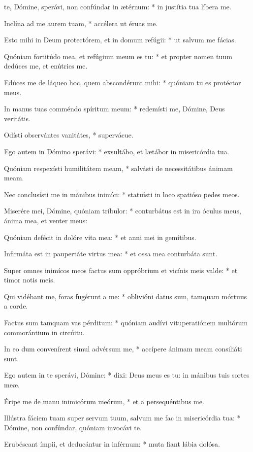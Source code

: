 \begin{psalmus}

 te, Dómine, sperávi, non confúndar in ætérnum: * in justítia tua líbera me.

Inclína ad me aurem tuam, * accélera ut éruas me.

Esto mihi in Deum protectórem, et in domum refúgii: * ut salvum me fácias.

Quóniam fortitúdo mea, et refúgium meum es tu: * et propter nomen tuum dedúces me, et enútries me.

Edúces me de láqueo hoc, quem abscondérunt mihi: * quóniam tu es protéctor meus.

In manus tuas comméndo spíritum meum: * redemísti me, Dómine, Deus veritátis.

Odísti observántes vanitátes, * supervácue.

Ego autem in Dómino sperávi: * exsultábo, et lætábor in misericórdia tua.

Quóniam respexísti humilitátem meam, * salvásti de necessitátibus ánimam meam.

Nec conclusísti me in mánibus inimíci: * statuísti in loco spatióso pedes meos.

Miserére mei, Dómine, quóniam tríbulor: * conturbátus est in ira óculus meus, ánima mea, et venter meus:

Quóniam defécit in dolóre vita mea: * et anni mei in gemítibus.

Infirmáta est in paupertáte virtus mea: * et ossa mea conturbáta sunt.

Super omnes inimícos meos factus sum oppróbrium et vicínis meis valde: * et timor notis meis.

Qui vidébant me, foras fugérunt a me: * oblivióni datus sum, tamquam mórtuus a corde.

Factus sum tamquam vas pérditum: * quóniam audívi vituperatiónem multórum commorántium in circúitu.

In eo dum convenírent simul advérsum me, * accípere ánimam meam consiliáti sunt.

Ego autem in te sperávi, Dómine: * dixi: Deus meus es tu: in mánibus tuis sortes meæ.

Éripe me de manu inimicórum meórum, * et a persequéntibus me.

Illústra fáciem tuam super servum tuum, salvum me fac in misericórdia tua: * Dómine, non confúndar, quóniam invocávi te.

Erubéscant ímpii, et deducántur in inférnum: * muta fiant lábia dolósa.


\end{psalmus}
